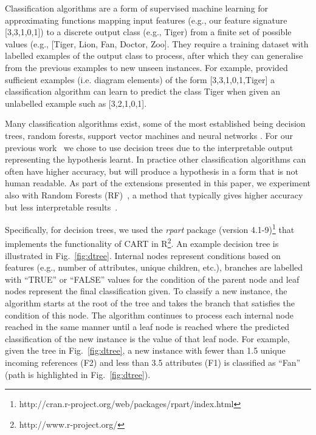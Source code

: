 Classification algorithms are a form of supervised machine learning for approximating functions mapping input features (e.g., our feature signature [3,3,1,0,1]) to a discrete output class (e.g., Tiger) from a finite set of possible values (e.g., [Tiger, Lion, Fan, Doctor, Zoo]. They require a training dataset with labelled examples of the output class to process, after which they can generalise from the previous examples to new unseen instances. For example, provided sufficient examples (i.e. diagram elements) of the form [3,3,1,0,1,Tiger] a classification algorithm can learn to predict the class Tiger when given an unlabelled example such as [3,2,1,0,1].

Many classification algorithms exist, some of the most established being decision trees, random forests, support vector machines and neural networks \cite{jiawei2001data}. For our previous work~\cite{zolotas2015inference} we chose to use decision trees due to the interpretable output representing the hypothesis learnt. In practice other classification algorithms can often have higher accuracy, but will produce a hypothesis in a form that is not human readable. As part of the extensions presented in this paper, we experiment also with Random Forests (RF)~\cite{Breiman2001}, a method that typically gives higher accuracy but less interpretable results~\cite{friedman2001elements}.

Specifically, for decision trees, we used the \textit{rpart} package (version 4.1-9)\footnote{http://cran.r-project.org/web/packages/rpart/index.html} that implements the functionality of CART \cite{breiman1984classification} in R\footnote{http://www.r-project.org/}. An example decision tree is illustrated in Fig.~\ref{fig:dtree}. Internal nodes represent conditions based on features (e.g., number of attributes, unique children, etc.), branches are labelled with ``TRUE'' or ``FALSE'' values for the condition of the parent node and leaf nodes represent the final classification given. To classify a new instance, the algorithm starts at the root of the tree and takes the branch that satisfies the condition of this node. The algorithm continues to process each internal node reached in the same manner until a leaf node is reached where the predicted classification of the new instance is the value of that leaf node. For example, given the tree in Fig.~\ref{fig:dtree}, a new instance with fewer than 1.5 unique incoming references (F2) and less than 3.5 attributes (F1) is classified as ``Fan'' (path is highlighted in Fig.~\ref{fig:dtree}).

